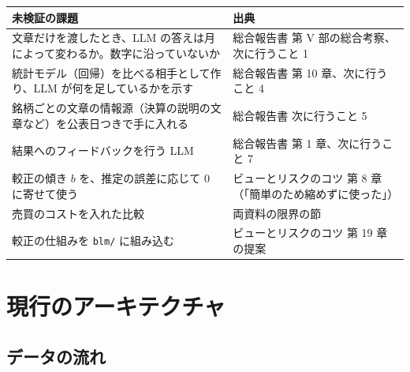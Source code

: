 \documentclass[xelatex,ja=standard,jafont=haranoaji,a4paper,10pt,openany]{bxjsreport}
\newcommand{\code}[1]{\texttt{#1}}
\begin{document}
\begin{center}
\small
\begin{tabular}{p{6.0cm}p{8.2cm}}
\toprule
未検証の課題 & 出典 \\
\midrule
文章だけを渡したとき、LLM の答えは月によって変わるか。数字に沿っていないか & 総合報告書 第 V 部の総合考察、次に行うこと 1 \\
統計モデル（回帰）を比べる相手として作り、LLM が何を足しているかを示す & 総合報告書 第 10 章、次に行うこと 4 \\
銘柄ごとの文章の情報源（決算の説明の文章など）を公表日つきで手に入れる & 総合報告書 次に行うこと 5 \\
結果へのフィードバックを行う LLM & 総合報告書 第 1 章、次に行うこと 7 \\
較正の傾き $b$ を、推定の誤差に応じて 0 に寄せて使う & ビューとリスクのコツ 第 8 章（「簡単のため縮めずに使った」） \\
売買のコストを入れた比較 & 両資料の限界の節 \\
較正の仕組みを \code{blm/} に組み込む & ビューとリスクのコツ 第 19 章の提案 \\
\bottomrule
\end{tabular}
\end{center}

\chapter{現行のアーキテクチャ}\label{ch:arch}

\section{データの流れ}
\end{document}
